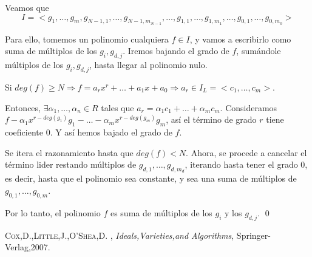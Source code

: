 \documentclass{article}
\begin{document}
Veamos que
$$I=<g_1,\dots , g_m, g_{N-1,1},\dots , g_{N-1,m_{N-1}},\dots, g_{1,1},\dots , g_{1,m_1},\dots , g_{0,1},\dots , g_{0,m_0}>$$

Para ello, tomemos un polinomio cualquiera $f\in I$, y vamos a escribirlo como suma de múltiplos de los $g_i,g_{d,j}$. Iremos bajando el grado de $f$, sumándole múltiplos de los $g_i,g_{d,j}$, hasta llegar al polinomio nulo.

Si $deg(f)\ge N \Rightarrow f=a_rx^r+\dots + a_1x+a_0 \Rightarrow a_r\in I_L=<c_1,\dots, c_m>$.

Entonces, $\exists \alpha_1,\dots, \alpha_n\in R$ tales que $a_r=\alpha_1 c_1+\dots + \alpha_m c_m$. Consideramos $f-\alpha_1 x^{r-deg(g_1)}g_1-\dots - \alpha_m x^{r-deg(g_m)}g_m$, así el término de grado $r$ tiene coeficiente $0$. Y así hemos bajado el grado de $f$.

Se itera el razonamiento hasta que $deg(f)<N$. Ahora, se procede a cancelar el término lider restando múltiplos de $g_{d,1},\dots, g_{d,m_d}$, iterando hasta tener el grado $0$, es decir, hasta que el polinomio sea constante, y sea una suma de múltiplos de$g_{0,1},\dots, g_{0,m}$.

Por lo tanto, el polinomio $f$ es suma de múltiplos de los $g_i$ y los $g_{d,j}$. 
\qed


\begin{thebibliography}{X}
 \textsc{Cox,D.,Little,J.,O'Shea,D.} ,
\textit{Ideals,Varieties,and Algorithms}, Springer-Verlag,2007.
\end{thebibliography}
\end{document}
